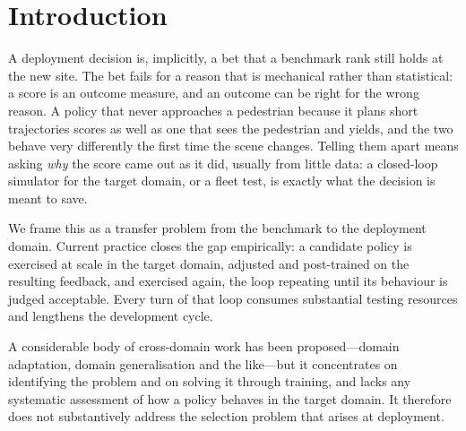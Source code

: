 \section{Introduction}
\label{sec:intro}

A deployment decision is, implicitly, a bet that a benchmark rank still holds at the new site. The
bet fails for a reason that is mechanical rather than statistical: a score is an outcome measure, and
an outcome can be right for the wrong reason. A
policy that never approaches a pedestrian because it plans short trajectories scores as well as one
that sees the pedestrian and yields, and the two behave very differently the first time the scene
changes. Telling them apart means asking \emph{why} the score came out as it did, usually from little
data: a closed-loop simulator for the target domain, or a fleet
test, is exactly what the decision is meant to save.

We frame this as a transfer problem from the benchmark to the deployment domain. Current practice
closes the gap empirically: a candidate policy is exercised at scale in the target domain, adjusted
and post-trained on the resulting feedback, and exercised again, the loop repeating until its
behaviour is judged acceptable. Every turn of that loop consumes substantial testing resources and
lengthens the development cycle.




A considerable body of cross-domain work has been proposed---domain adaptation, domain generalisation
and the like---but it concentrates on identifying the problem and on solving it through training, and
lacks any systematic assessment of how a policy behaves in the target domain. It therefore does not
substantively address the selection problem that arises at deployment.


